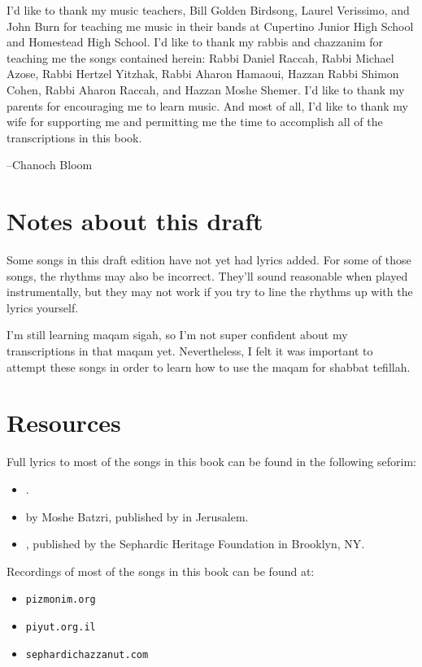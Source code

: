 \documentclass[letterpaper]{memoir}
\begin{document}
I'd like to thank my music teachers, Bill Golden Birdsong, Laurel 
Verissimo, and John Burn for teaching me music in their bands at 
Cupertino Junior High School and Homestead High School.
I'd like to thank my rabbis and 
chazzanim for teaching me the songs contained herein: Rabbi Daniel Raccah, Rabbi 
Michael Azose, Rabbi Hertzel Yitzhak, Rabbi Aharon Hamaoui, Hazzan Rabbi Shimon 
Cohen, Rabbi Aharon Raccah, and Hazzan Moshe Shemer. I'd like to thank my 
parents for encouraging me to learn music. And most of all, I'd like to thank my 
wife for supporting me and permitting me the time to accomplish all of the 
transcriptions in this book.

--Chanoch Bloom

\section*{Notes about this draft}

Some songs in this draft edition have not yet had lyrics added. For 
some of those songs, the rhythms may also be incorrect. They'll sound 
reasonable when played instrumentally, but they may not work if you try 
to line the rhythms up with the lyrics yourself.

I'm still learning maqam sigah, so I'm not super confident about my 
transcriptions in that maqam yet. Nevertheless, I felt it was important 
to attempt these songs in order to learn how to use the maqam for 
shabbat tefillah.

\section*{Resources}

Full lyrics to most of the songs in this book can be found in the following seforim:

\begin{itemize}
\item {}.
\item {} by Moshe Batzri, published by  in Jerusalem.
\item {}, published by the Sephardic Heritage Foundation in Brooklyn, NY.
\end{itemize}

\noindent
Recordings of most of the songs in this book can be found at:

\begin{itemize}
\item \texttt{pizmonim.org}
\item \texttt{piyut.org.il}
\item \texttt{sephardichazzanut.com}
\end{itemize}
\end{document}
